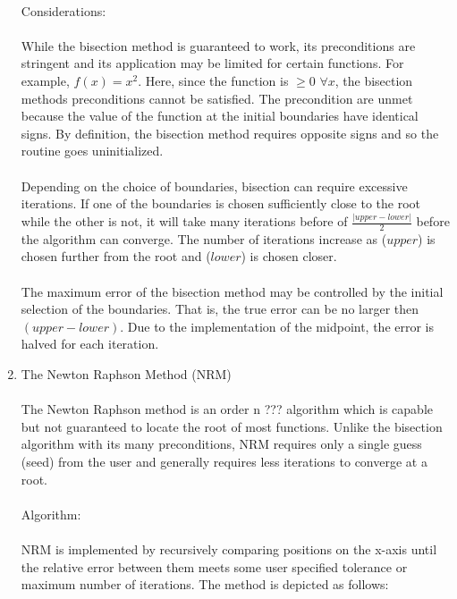 \documentclass{report}
\begin{document}
\begin{enumerate}
\\
Considerations: 
\\
\\While the bisection method is guaranteed to work, its preconditions are stringent and its application may be limited for certain functions. For example, $f(x)=x^2$. Here, since the function is $\geq0$ $\forall x$, the bisection methods preconditions cannot be satisfied. The precondition are unmet because the value of the function at the initial boundaries have identical signs. By definition, the bisection method requires opposite signs and so the routine goes uninitialized.
\\
\\ Depending on the choice of boundaries, bisection can require excessive iterations. If one of the boundaries is chosen sufficiently close to the root while the other is not, it will take many iterations before of $\frac{\left|upper-lower\right|}{2}$ before the algorithm can converge. The number of iterations increase as ($upper$) is chosen further from the root and ($lower$) is chosen closer.  
\\
\\The maximum error of the bisection method may be controlled by the initial selection of the boundaries. That is, the true error can be no larger then $(upper-lower)$. Due to the implementation of the midpoint, the error is halved for each iteration. 
\\
\item The Newton Raphson Method (NRM)
\\
\\The Newton Raphson method is an order n ??? algorithm which is capable but not guaranteed to locate the root of most functions. Unlike the bisection algorithm with its many preconditions, NRM requires only a single guess (seed) from the user and generally requires less iterations to converge at a root.
\\
\\Algorithm:  
\\
\\NRM is implemented by recursively comparing positions on the x-axis until the relative error between them meets some user specified tolerance or maximum number of iterations. The method is depicted as follows:
\\
\\

\end{enumerate}
\end{document}
